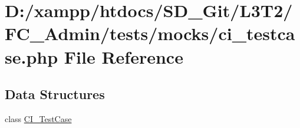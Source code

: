 \hypertarget{ci__testcase_8php}{}\section{D\+:/xampp/htdocs/\+S\+D\+\_\+\+Git/\+L3\+T2/\+F\+C\+\_\+\+Admin/tests/mocks/ci\+\_\+testcase.php File Reference}
\label{ci__testcase_8php}
\subsection*{Data Structures}
\begin{DoxyCompactItemize}
\item 
class \hyperlink{class_c_i___test_case}{C\+I\+\_\+\+Test\+Case}
\end{DoxyCompactItemize}
